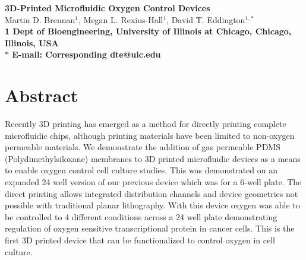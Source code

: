 \date{}

\pagestyle{myheadings}







\begin{flushleft}
{\Large
\textbf{3D-Printed Microfluidic Oxygen Control Devices}
}
\\
Martin D. Brennan$^{1}$, 
Megan L. Rexius-Hall$^{1}$, 
David T. Eddington$^{1,\ast}$
\\
\bf{1} Dept of Bioengineering, University of Illinois at Chicago, Chicago, Illinois, USA
\\
$\ast$ E-mail: Corresponding dte@uic.edu
\end{flushleft}

\section*{Abstract}

Recently 3D printing has emerged as a method for directly printing complete microfluidic chips, 
although printing materials have been limited to non-oxygen permeable materials.
We demonstrate the addition of gas permeable PDMS (Polydimethylsiloxane) membranes to 3D printed microfluidic devices as a means to enable oxygen control cell culture studies.
This was demonstrated on an expanded 24 well version of our previous device which was for a 6-well plate.
The direct printing allows integrated distribution channels and device geometries not possible with traditional planar lithography.
With this device oxygen was able to be controlled to 4 different conditions across a 24 well plate demonstrating regulation of oxygen sensitive transcriptional protein in cancer cells.
This is the first 3D printed device that can be functionalized to control oxygen in cell culture.


